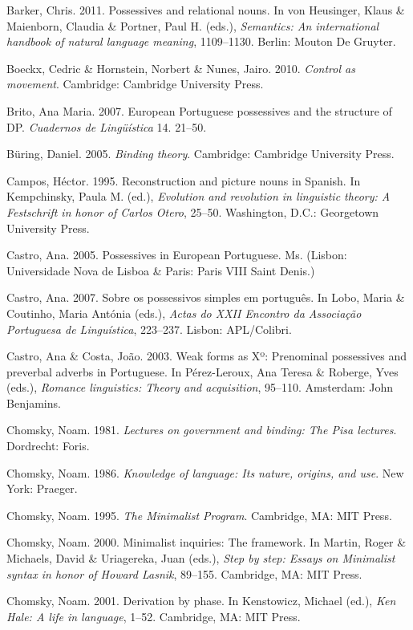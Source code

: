 \documentclass[output=paper]{langsci/langscibook}
\begin{document}
Barker, Chris. 2011. Possessives and relational nouns. In von Heusinger, Klaus \& Maienborn, Claudia \& Portner, Paul H. (eds.), \textit{Semantics: An international handbook of natural language meaning}, 1109–1130. Berlin: Mouton De Gruyter.

Boeckx, Cedric \& Hornstein, Norbert \& Nunes, Jairo. 2010. \textit{Control as movement}. Cambridge: Cambridge University Press.

Brito, Ana Maria. 2007. European Portuguese possessives and the structure of DP. \textit{Cuadernos de Lingüística} 14. 21–50.

Büring, Daniel. 2005. \textit{Binding theory}. Cambridge: Cambridge University Press.

Campos, Héctor. 1995. Reconstruction and picture nouns in Spanish. In Kempchinsky, Paula M. (ed.), \textit{Evolution and revolution in linguistic theory: A Festschrift in honor of Carlos Otero}, 25–50. Washington, D.C.: Georgetown University Press.

Castro, Ana. 2005. Possessives in European Portuguese. Ms. (Lisbon: Universidade Nova de Lisboa \& Paris: Paris VIII Saint Denis.)

Castro, Ana. 2007. Sobre os possessivos simples em português. In Lobo, Maria \& Coutinho, Maria Antónia (eds.), \textit{Actas do XXII Encontro da Associação Portuguesa de Linguística}, 223–237. Lisbon: APL/Colibri. 

Castro, Ana \& Costa, João. 2003. Weak forms as Xº: Prenominal possessives and preverbal adverbs in Portuguese. In Pérez-Leroux, Ana Teresa \& Roberge, Yves (eds.), \textit{Romance linguistics: Theory and acquisition}, 95–110. Amsterdam: John Benjamins.

Chomsky, Noam. 1981. \textit{Lectures on government and binding: The Pisa lectures}. Dordrecht: Foris.

Chomsky, Noam. 1986. \textit{Knowledge of language: Its nature, origins, and use}. New York: Praeger.

Chomsky, Noam. 1995. \textit{The Minimalist Program}. Cambridge, MA: MIT Press.

Chomsky, Noam. 2000. Minimalist inquiries: The framework. In Martin, Roger \& Michaels, David \& Uriagereka, Juan (eds.), \textit{Step by step: Essays on Minimalist syntax in honor of Howard Lasnik}, 89–155. Cambridge, MA: MIT Press.

Chomsky, Noam. 2001. Derivation by phase. In Kenstowicz, Michael (ed.), \textit{Ken Hale: A life in language}, 1–52. Cambridge, MA: MIT Press.
\end{document}

